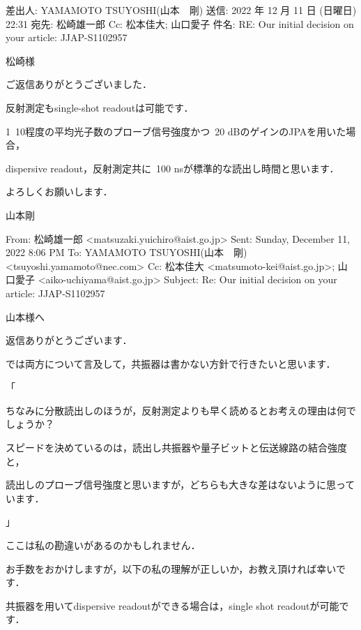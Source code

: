  

 

差出人: YAMAMOTO TSUYOSHI(山本　剛)
送信: 2022 年 12 月 11 日 (日曜日) 22:31
宛先: 松崎雄一郎
Cc: 松本佳大; 山口愛子
件名: RE: Our initial decision on your article: JJAP-S1102957

 

松崎様

 

ご返信ありがとうございました．

 

反射測定もsingle-shot readoutは可能です．

 

1~10程度の平均光子数のプローブ信号強度かつ~20 dBのゲインのJPAを用いた場合，

dispersive readout，反射測定共に~100 nsが標準的な読出し時間と思います．

 

よろしくお願いします．

山本剛

From: 松崎雄一郎 <matsuzaki.yuichiro@aist.go.jp>
Sent: Sunday, December 11, 2022 8:06 PM
To: YAMAMOTO TSUYOSHI(山本　剛) <tsuyoshi.yamamoto@nec.com>
Cc: 松本佳大 <matsumoto-kei@aist.go.jp>; 山口愛子 <aiko-uchiyama@aist.go.jp>
Subject: Re: Our initial decision on your article: JJAP-S1102957

 

山本様へ

返信ありがとうございます．

 

では両方について言及して，共振器は書かない方針で行きたいと思います．

 

「

ちなみに分散読出しのほうが，反射測定よりも早く読めるとお考えの理由は何でしょうか？

スピードを決めているのは，読出し共振器や量子ビットと伝送線路の結合強度と，

読出しのプローブ信号強度と思いますが，どちらも大きな差はないように思っています．

」

 

ここは私の勘違いがあるのかもしれません．

お手数をおかけしますが，以下の私の理解が正しいか，お教え頂ければ幸いです．

 

共振器を用いてdispersive readoutができる場合は，single shot readoutが可能です．

